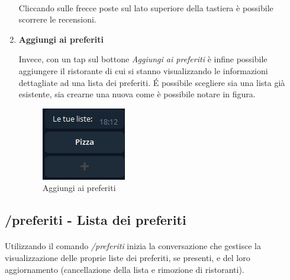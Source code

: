 \documentclass[a4paper, 12pt]{article}
\begin{document}
\begin{enumerate}
	\paragraph{}
	Cliccando sulle frecce poste sul lato superiore della tastiera è possibile scorrere le recensioni.
	
	\item \textbf{Aggiungi ai preferiti}
	
	Invece, con un tap sul bottone \textit{Aggiungi ai preferiti} è infine possibile aggiungere il ristorante di cui si stanno visualizzando le informazioni dettagliate ad una lista dei preferiti. É possibile scegliere sia una lista già esistente, sia crearne una nuova come è possibile notare in figura.
	\begin{figure}[!htb]
		\centering
		\includegraphics[scale=0.9]{cercaCommand_addToFavorites.png}
		\caption{Aggiungi ai preferiti}
	\end{figure}
	\paragraph{}	
	\end{enumerate}
	
	\newpage
	\subsection{/preferiti - Lista dei preferiti}
	\paragraph{}
	Utilizzando il comando \textit{/preferiti} inizia la conversazione che gestisce la visualizzazione delle proprie liste dei preferiti, se presenti, e del loro aggiornamento (cancellazione della lista e rimozione di ristoranti).
	
\end{document}
